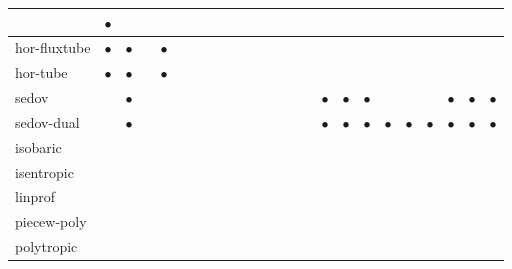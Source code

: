 \documentclass[\mydriver,12pt,twoside,notitlepage,a4paper]{article}
\newcommand{\req}{$\bullet$}
\begin{document}
\begin{longtable}{l|c|c|c|c|c|c|c|c|c|c|c|c|c|c|c|c|c|c|c|c|c|c|c}
                    & \req & {}   & {}   & {}   & {}   & {}   & {}
                    & {}   & {}   & {}   & {}   & {}   & {}   & {}
                    & {}   & {}   \\
\midrule
  hor-fluxtube      & \req & \req & {}   & \req & {}   & {}   & {}
                    & {}   & {}   & {}   & {}   & {}   & {}   & {}
                    & {}   & {}   & {}   & {}   & {}   & {}   & {}
                    & {}   & {}   \\
\midrule
  hor-tube          & \req & \req & {}   & \req & {}   & {}   & {}
                    & {}   & {}   & {}   & {}   & {}   & {}   & {}
                    & {}   & {}   & {}   & {}   & {}   & {}   & {}
                    & {}   & {}   \\
\midrule
  sedov             & {}   & \req & {}   & {}   & {}   & {}   & {}
                    & {}   & {}   & {}   & {}   & {}   & {}   & {}
                    & \req & \req & \req & {}   & {}   & {}   & \req
                    & \req & \req \\
\midrule
  sedov-dual        & {}   & \req & {}   & {}   & {}   & {}   & {}
                    & {}   & {}   & {}   & {}   & {}   & {}   & {}
                    & \req & \req & \req & \req & \req & \req & \req
                    & \req & \req \\
\midrule
  isobaric          & {}   & {}   & {}   & {}   & {}   & {}   & {}
                    & {}   & {}   & {}   & {}   & {}   & {}   & {}
                    & {}   & {}   & {}   & {}   & {}   & {}   & {}
                    & {}   & {}   \\
\midrule
  isentropic        & {}   & {}   & {}   & {}   & {}   & {}   & {}
                    & {}   & {}   & {}   & {}   & {}   & {}   & {}
                    & {}   & {}   & {}   & {}   & {}   & {}   & {}
                    & {}   & {}   \\
\midrule
  linprof           & {}   & {}   & {}   & {}   & {}   & {}   & {}
                    & {}   & {}   & {}   & {}   & {}   & {}   & {}
                    & {}   & {}   & {}   & {}   & {}   & {}   & {}
                    & {}   & {}   \\
\midrule
  piecew-poly       & {}   & {}   & {}   & {}   & {}   & {}   & {}
                    & {}   & {}   & {}   & {}   & {}   & {}   & {}
                    & {}   & {}   & {}   & {}   & {}   & {}   & {}
                    & {}   & {}   \\
\midrule
  polytropic        & {}   & {}   & {}   & {}   & {}   & {}   & {}
                    & {}   & {}   & {}   & {}   & {}   & {}   & {}
                    & {}   & {}   & {}   & {}   & {}   & {}   & {}
                    & {}   & {}   \\
%
\bottomrule
\end{longtable}
\end{document}
